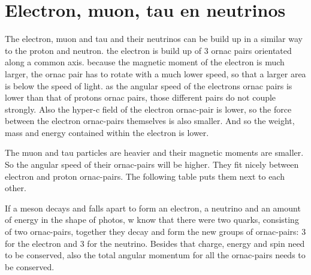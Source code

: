 \chapter{Electron, muon, tau en neutrinos}

The electron, muon and tau and their neutrinos can be build up in a similar way to the proton and neutron. the electron is build up of 3 ornac pairs orientated along a common axis. because the magnetic moment of the electron is much larger, the ornac pair has to rotate with a much lower speed, so that a larger area is below the speed of light. as the angular speed of the electrons ornac pairs is lower than that of protons ornac pairs, those different pairs do not couple strongly. Also the hyper-c field of the electron ornac-pair is lower, so the force between the electron ornac-pairs themselves is also smaller. And so the weight, mass and energy contained within the electron is lower.

The muon and tau particles are heavier and their magnetic moments are smaller. So the angular speed of their ornac-pairs will be higher. They fit nicely between electron and proton ornac-pairs. The following table puts them next to each other.

If a meson decays and falls apart to form an electron, a neutrino and an amount of energy in the shape of photos, w know that there were two quarks, consisting of two ornac-pairs, together they decay and form the new groups of ornac-pairs: 3 for the electron and 3 for the neutrino. Besides that charge, energy and spin need to be conserved, also the total angular momentum for all the ornac-pairs needs to be conserved.
